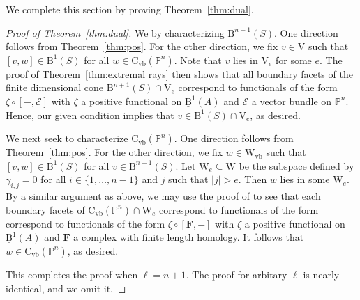 \documentclass[12pt]{amsart}
\theoremstyle{definition}
\theoremstyle{remark}
\newcommand{\PP}{\mathbb{P}}
\newcommand{\VV}{\mathrm{V}}
\newcommand{\WW}{\mathrm{W}}
\newcommand{\Wvb}{\mathrm{W}_{\text{vb}}}
\newcommand{\cE}{\mathcal{E}}
\newcommand{\FF}{\mathbf{F}}
\newcommand{\CvbQ}{\mathrm{C}_{\text{vb}}}
\newcommand{\BBQ}{\underline{\mathrm{B}}}
\begin{document}
%
%
%
%



We complete this section by proving Theorem~\ref{thm:dual}.



\begin{proof}[Proof of Theorem~\ref{thm:dual}]
We by characterizing $\BBQ^{n+1}(S)$.  One direction follows from Theorem~\ref{thm:pos}.  For the other direction, we fix $v\in \VV$ such that $[v,w]\in \BBQ^1(S)$ for all $w\in \CvbQ(\PP^n)$.  Note that $v$ lies in $\VV_e$ for some $e$.  The proof of Theorem~\ref{thm:extremal rays} then shows that all boundary facets of the finite dimensional cone $\BBQ^{n+1}(S)\cap \VV_e$ correspond to functionals of the form $\zeta\circ [-,\cE]$ with $\zeta$ a positive functional on $\BBQ^{1}(A)$ and $\cE$ a vector bundle on $\PP^n$.  Hence, our given condition implies that $v\in \BBQ^1(S)\cap \VV_e$, as desired.  

We next seek to characterize $\CvbQ(\PP^n)$. One direction follows from Theorem~\ref{thm:pos}.  For the other direction, we fix $w\in \Wvb$ such that $[v,w]\in \BBQ^1(S)$ for all $v\in \BBQ^{n+1}(S)$. 
Let $\WW_e\subseteq  \WW$ be the subspace defined by $\gamma_{i,j}=0$ for all $i\in \{1,\dots,n-1\}$ and $j$ such that $|j|>e$.  Then $w$ lies in some $\WW_e$.  By a similar argument as above, we may use the proof of \cite[XXXX]{eis-schrey1} to see that each boundary facets of $\CvbQ(\PP^n)\cap \WW_e$ correspond to functionals of the form correspond to functionals of the form $\zeta\circ [\FF,-]$ with $\zeta$ a positive functional on $\BBQ^{1}(A)$ and $\FF$ a complex with finite length homology.  It follows that $w\in \CvbQ(\PP^n)$, as desired.

This completes the proof when $\ell=n+1$.  The proof for arbitary $\ell$ is nearly identical, and we omit it.
\end{proof}
\end{document}
